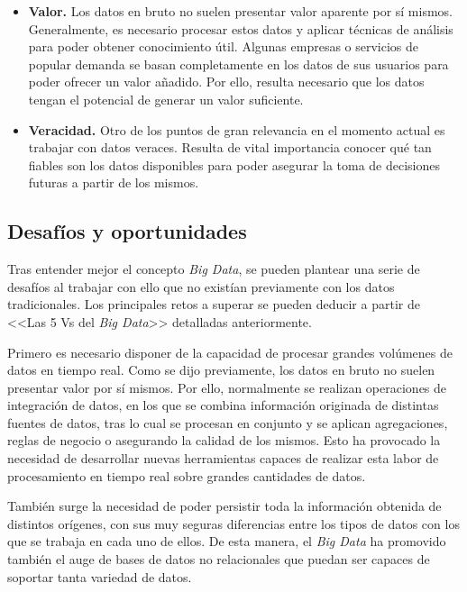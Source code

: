 \begin{itemize}
    \item \textbf{Valor.} Los datos en bruto no suelen presentar valor aparente por sí mismos. Generalmente, es necesario procesar estos datos y aplicar técnicas de análisis para poder obtener conocimiento útil. Algunas empresas o servicios de popular demanda se basan completamente en los datos de sus usuarios para poder ofrecer un valor añadido. Por ello, resulta necesario que los datos tengan el potencial de generar un valor suficiente. 
    
    \item \textbf{Veracidad.} Otro de los puntos de gran relevancia en el momento actual es trabajar con datos veraces. Resulta de vital importancia conocer qué tan fiables son los datos disponibles para poder asegurar la toma de decisiones futuras a partir de los mismos.
\end{itemize}

\subsection{Desafíos y oportunidades}

Tras entender mejor el concepto \textit{Big Data}, se pueden plantear una serie de desafíos al trabajar con ello que no existían previamente con los datos tradicionales. Los principales retos a superar se pueden deducir a partir de <<Las 5 Vs del \textit{Big Data}>> detalladas anteriormente.

Primero es necesario disponer de la capacidad de procesar grandes volúmenes de datos en tiempo real. Como se dijo previamente, los datos en bruto no suelen presentar valor por sí mismos. Por ello, normalmente se realizan operaciones de integración de datos, en los que se combina información originada de distintas fuentes de datos, tras lo cual se procesan en conjunto y se aplican agregaciones, reglas de negocio o asegurando la calidad de los mismos. Esto ha provocado la necesidad de desarrollar nuevas herramientas capaces de realizar esta labor de procesamiento en tiempo real sobre grandes cantidades de datos.

También surge la necesidad de poder persistir toda la información obtenida de distintos orígenes, con sus muy seguras diferencias entre los tipos de datos con los que se trabaja en cada uno de ellos. De esta manera, el \textit{Big Data} ha promovido también el auge de bases de datos no relacionales que puedan ser capaces de soportar tanta variedad de datos.

